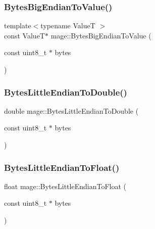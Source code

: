 \subsubsection{\texorpdfstring{Bytes\+Big\+Endian\+To\+Value()}{BytesBigEndianToValue()}}
{\footnotesize\ttfamily template$<$typename ValueT $>$ \\
const ValueT$\ast$ mage\+::\+Bytes\+Big\+Endian\+To\+Value (\begin{DoxyParamCaption}\item[{const uint8\+\_\+t $\ast$}]{bytes }\end{DoxyParamCaption})}

\hypertarget{namespacemage_a1264a1a92902534e596430b67784869a}{}\label{namespacemage_a1264a1a92902534e596430b67784869a} 
\subsubsection{\texorpdfstring{Bytes\+Little\+Endian\+To\+Double()}{BytesLittleEndianToDouble()}}
{\footnotesize\ttfamily double mage\+::\+Bytes\+Little\+Endian\+To\+Double (\begin{DoxyParamCaption}\item[{const uint8\+\_\+t $\ast$}]{bytes }\end{DoxyParamCaption})}

\hypertarget{namespacemage_ae8c9922f140fd0f66a8dc71edca6ae0e}{}\label{namespacemage_ae8c9922f140fd0f66a8dc71edca6ae0e} 
\subsubsection{\texorpdfstring{Bytes\+Little\+Endian\+To\+Float()}{BytesLittleEndianToFloat()}}
{\footnotesize\ttfamily float mage\+::\+Bytes\+Little\+Endian\+To\+Float (\begin{DoxyParamCaption}\item[{const uint8\+\_\+t $\ast$}]{bytes }\end{DoxyParamCaption})}

\hypertarget{namespacemage_ac391c9723ff006ce3e3f824108dbcc61}{}\label{namespacemage_ac391c9723ff006ce3e3f824108dbcc61} 
